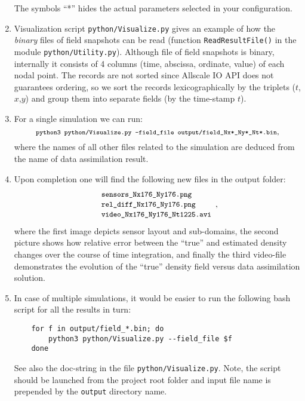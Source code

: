 \documentclass[]{article}
\begin{document}
\begin{enumerate}
The symbols ``*'' hides the actual parameters selected in your configuration.
\item Visualization script \texttt{python/Visualize.py} gives an example of how the \textit{binary} files of field snapshots can be read (function \texttt{ReadResultFile()} in the module \texttt{python/Utility.py}). Although file of field snapshots is binary, internally it consists of 4 columns (time, abscissa, ordinate, value) of each nodal point. The records are not sorted since Allscale IO API does not guarantees ordering, so we sort the records lexicographically by the triplets ($t$,$x$,$y$) and group them into separate fields (by the time-stamp $t$).
\item For a single simulation we can run:
$$
\mbox{\footnotesize\texttt{python3 python/Visualize.py --field\_file  output/field\_Nx*\_Ny*\_Nt*.bin}},
$$
where the names of all other files related to the simulation are deduced from the name of data assimilation result.
\item Upon completion one will find the following new files in the output folder:
$$
\begin{array}{l}
\mbox{\small\texttt{sensors\_Nx176\_Ny176.png}} \\
\mbox{\small\texttt{rel\_diff\_Nx176\_Ny176.png}} \\
\mbox{\small\texttt{video\_Nx176\_Ny176\_Nt1225.avi}}
\end{array},
$$
where the first image depicts sensor layout and sub-domains, the second picture shows how relative error between the ``true'' and estimated density changes over the course of time integration, and finally the third video-file demonstrates the evolution of the ``true'' density field versus data assimilation solution.
\item In case of multiple simulations, it would be easier to run the following bash script for all the results in turn:
\begin{verbatim}
    for f in output/field_*.bin; do
        python3 python/Visualize.py --field_file $f
    done
\end{verbatim}
See also the doc-string in the file \texttt{python/Visualize.py}. Note, the script should be launched from the project root folder and input file name is prepended by the \texttt{output} directory name.
\end{enumerate}
\end{document}
